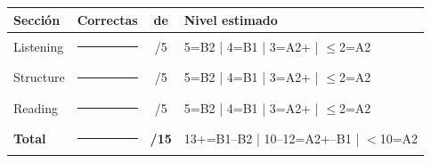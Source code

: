 \documentclass[10pt,a4paper]{article}
\begin{document}
\begin{center}
\begin{tabular}{lccl}
\toprule
\textbf{Secci\'on} & \textbf{Correctas} & \textbf{de} & \textbf{Nivel estimado} \\
\midrule
Listening  & \rule{1cm}{0.4pt} & /5 & 5=B2 | 4=B1 | 3=A2+ | $\leq$2=A2 \\
Structure  & \rule{1cm}{0.4pt} & /5 & 5=B2 | 4=B1 | 3=A2+ | $\leq$2=A2 \\
Reading    & \rule{1cm}{0.4pt} & /5 & 5=B2 | 4=B1 | 3=A2+ | $\leq$2=A2 \\
\midrule
\textbf{Total} & \rule{1cm}{0.4pt} & \textbf{/15} &
13+=B1--B2 | 10--12=A2+--B1 | $<$10=A2 \\
\bottomrule
\end{tabular}
\end{center}
\end{document}
